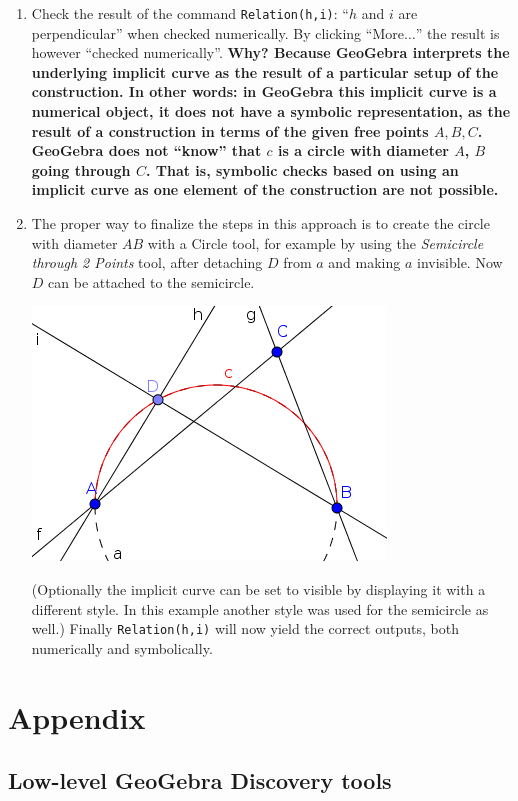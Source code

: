 \documentclass{article}
\begin{document}
\begin{enumerate}
\begin{enumerate}
\begin{center}
\end{center}
      \item Check the result of the command \texttt{Relation(h,i)}: ``$h$ and $i$ are perpendicular'' when checked numerically. By clicking ``More$\ldots$'' the result is however ``checked numerically''. \textbf{Why? Because GeoGebra interprets the underlying implicit curve as the result of a particular setup of the construction. In other words: in GeoGebra this implicit curve is a numerical object, it does not have a symbolic representation, as the result of a construction in terms of the given free points $A, B, C$. GeoGebra does not ``know'' that $c$ is a circle with diameter $A$, $B$ going through $C$. That is, symbolic checks based on using an implicit curve as one element of the construction are not possible.}
      \item The proper way to finalize the steps in this approach is to create the circle with diameter $AB$ with a Circle tool, for example by using the \textit{Semicircle through 2 Points} tool, after detaching $D$ from $a$ and making $a$ invisible. Now $D$ can be attached to the semicircle.
\begin{center}
\includegraphics[scale=0.5]{limitations-Thales1-3}
\end{center}
      (Optionally the implicit curve can be set to visible by displaying it with a different style. In this example another style was used for the semicircle as well.) Finally \texttt{Relation(h,i)} will now yield the correct outputs,  both numerically and symbolically.
    \end{enumerate}
\end{enumerate}

\section{Appendix}
\label{sec:Appendix}
\subsection{Low-level GeoGebra Discovery tools}
\end{document}
